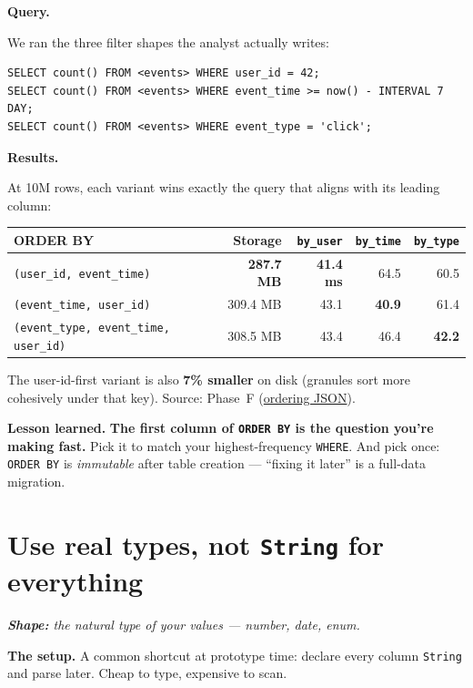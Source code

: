 \documentclass[11pt]{article}
\renewcommand{\arraystretch}{1.15}
\newcommand{\shape}[1]{%
  \par\noindent\textit{\textbf{Shape:} #1}\par\smallskip}
\newcommand{\queryHd}{%
  \par\smallskip\noindent\textbf{\color{accentblue}Query.}\par\nopagebreak\smallskip}
\newcommand{\resultsHd}{%
  \par\smallskip\noindent\textbf{\color{accentblue}Results.}\par\nopagebreak\smallskip}
\newcommand{\lesson}[1]{%
  \par\medskip
  \begin{lessonbox}\textbf{\color{accentgreen}Lesson learned.}\enspace #1\end{lessonbox}}
\begin{document}
\queryHd
We ran the three filter shapes the analyst actually writes:
\begin{lstlisting}
SELECT count() FROM <events> WHERE user_id = 42;
SELECT count() FROM <events> WHERE event_time >= now() - INTERVAL 7 DAY;
SELECT count() FROM <events> WHERE event_type = 'click';
\end{lstlisting}

\resultsHd
At 10M rows, each variant wins exactly the query that aligns with
its leading column:

\renewcommand{\arraystretch}{1.20}
\begin{tabularx}{\linewidth}{@{}X r r r r@{}}
\toprule
\textbf{ORDER BY}                               & \textbf{Storage} & \texttt{by\_user} & \texttt{by\_time} & \texttt{by\_type}\\
\midrule
\rowcolor{accentgreen!12}\texttt{(user\_id, event\_time)} & \textbf{287.7 MB} & \textbf{41.4 ms} & 64.5 & 60.5\\
\texttt{(event\_time, user\_id)}                          & 309.4 MB          & 43.1             & \textbf{40.9}    & 61.4\\
\texttt{(event\_type, event\_time, user\_id)}             & 308.5 MB          & 43.4             & 46.4             & \textbf{42.2}\\
\bottomrule
\end{tabularx}

\smallskip
The user-id-first variant is also \textbf{7\% smaller} on disk (granules
sort more cohesively under that key). Source: Phase~F
(\href{run:results/compare_features_20260503_194824.json}{ordering JSON}).

\lesson{%
\textbf{The first column of \texttt{ORDER BY} is the question you're
making fast.} Pick it to match your highest-frequency \texttt{WHERE}.
And pick once: \texttt{ORDER BY} is \emph{immutable} after table
creation — ``fixing it later'' is a full-data migration.}

\section{Use real types, not \texttt{String} for everything}

\shape{the natural type of your values — number, date, enum.}

\textbf{The setup.}
A common shortcut at prototype time: declare every column \texttt{String}
and parse later. Cheap to type, expensive to scan.
\end{document}
